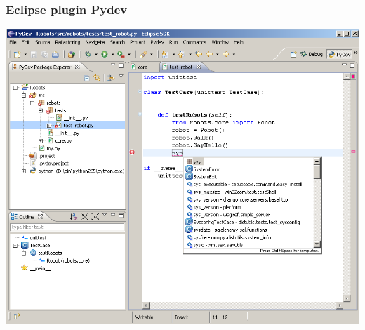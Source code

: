 \begin{frame}
    \frametitle{Eclipse plugin Pydev}
    \begin{center}
        \includegraphics[height=0.9\textheight]{png/eclipse_screenshot_code_completion.png}
    \end{center}
\end{frame}
